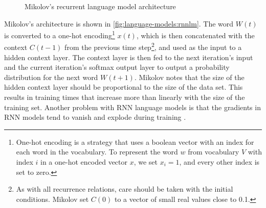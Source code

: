 \begin{figure}[h]
    \centering
    \caption{Mikolov's recurrent language model architecture}\label{fig:language-models:rnnlm}
\end{figure}

Mikolov's architecture is shown in \autoref{fig:language-models:rnnlm}.
The word $W(t)$ is converted to a one-hot encoding\footnote{
    One-hot encoding is a strategy that uses a boolean vector with an index for each word in the vocabulary.
    To represent the word $w$ from vocabulary $V$ with index $i$ in a one-hot encoded vector $x$, we set $x_i = 1$, and every other index is set to zero.}
$x(t)$, which is then concatenated with the context $C(t-1)$ from the previous time step\footnote{
    As with all recurrence relations, care should be taken with the initial conditions.
    Mikolov set $C(0)$ to a vector of small real values close to 0.1.},
and used as the input to a hidden context layer.
The context layer is then fed to the next iteration's input and the current iteration's softmax output layer to output a probability distribution for the next word $W(t+1)$.
Mikolov notes that the size of the hidden context layer should be proportional to the size of the data set.
This results in training times that increase more than linearly with the size of the training set.
Another problem with RNN language models is that the gradients in RNN models tend to vanish and explode during training \cite{jing_survey}.

